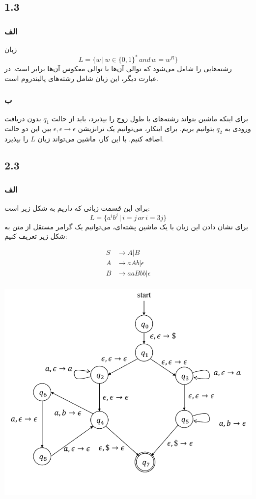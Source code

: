 \subsection*{1.3}

\subsubsection*{الف}
زبان 
\[L = \{w \,|\, w \in \{0, 1\}^{*} \,and\, w = w^R\}\]
رشته‌هایی را شامل می‌شود که توالی آن‌ها با توالی معکوس آن‌ها برابر است. در عبارت دیگر، این زبان شامل رشته‌های پالیندروم است.

\subsubsection*{ب}
برای اینکه ماشین بتواند رشته‌های با طول زوج را بپذیرد، باید از حالت $q_1$ بدون دریافت ورودی به $q_2$ بتوانیم بریم. برای اینکار، می‌توانیم یک ترانزیشن $\epsilon, \epsilon \to \epsilon$ بین این دو حالت اضافه کنیم. با این کار، ماشین می‌تواند زبان $L$ را بپذیرد.

\subsection*{2.3}

\subsubsection*{الف}
برای این قسمت زبانی که داریم به شکل زیر است:
\[L = \{a^i b^j \,|\, i = j \,or\, i = 3j\}\]
برای نشان دادن این زبان با یک ماشین پشته‌ای، می‌توانیم یک گرامر مستقل از متن به شکل زیر تعریف کنیم:

\begin{align*}
	S &\to A | B \\
	A &\to aAb | \epsilon \\
	B &\to aaBbb | \epsilon \\
\end{align*}

\begin{center}
	\includegraphics{image3}
\end{center}

